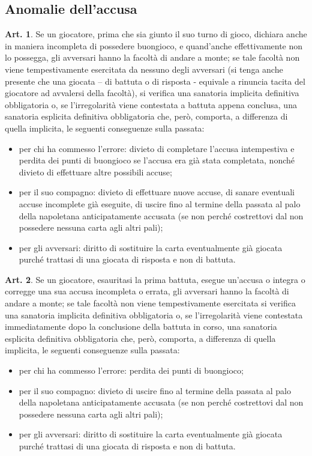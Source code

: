 \documentclass[italian,a4paper]{article}
\theoremstyle{definition}
\newtheorem{art}{Art.}
\begin{document}
\subsection{Anomalie dell'accusa}
\begin{art}
Se un giocatore, prima che sia giunto il suo turno di gioco, dichiara anche in maniera incompleta di possedere buongioco, e quand'anche effettivamente non lo possegga, gli avversari hanno la facoltà di andare a monte; se tale facoltà non viene tempestivamente esercitata da nessuno degli avversari (si tenga anche presente che una giocata – di battuta o di risposta - equivale a rinuncia tacita del giocatore ad avvalersi della facoltà), si verifica una sanatoria implicita definitiva obbligatoria o, se l'irregolarità viene contestata a battuta appena conclusa, una sanatoria esplicita definitiva obbligatoria che, però, comporta, a differenza di quella implicita, le seguenti conseguenze sulla passata:
\begin{itemize}
\item    per chi ha commesso l'errore: divieto di completare l'accusa intempestiva e perdita dei punti di buongioco se l'accusa era già stata completata, nonché divieto di effettuare altre possibili accuse;
\item    per il suo compagno: divieto di effettuare nuove accuse, di sanare eventuali accuse incomplete già eseguite, di uscire fino al termine della passata al palo della napoletana anticipatamente accusata (se non perché costrettovi dal non possedere nessuna carta agli altri pali);
\item     per gli avversari: diritto di sostituire la carta eventualmente già giocata purché trattasi di una giocata di risposta e non di battuta.
    \end{itemize}
\end{art}
\begin{art}
Se un giocatore, esauritasi la prima battuta, esegue un'accusa o integra o corregge una sua accusa incompleta o errata, gli avversari hanno la facoltà di andare a monte; se tale facoltà non viene tempestivamente esercitata si verifica una sanatoria implicita definitiva obbligatoria o, se l'irregolarità viene contestata immediatamente dopo la conclusione della battuta in corso, una sanatoria esplicita definitiva obbligatoria che, però, comporta, a differenza di quella implicita, le seguenti conseguenze sulla passata:
\begin{itemize}
\item    per chi ha commesso l'errore: perdita dei punti di buongioco;
\item    per il suo compagno: divieto di uscire fino al termine della passata al palo della napoletana anticipatamente accusata (se non perché costrettovi dal non possedere nessuna carta agli altri pali);
\item     per gli avversari: diritto di sostituire la carta eventualmente già giocata purché trattasi di una giocata di risposta e non di battuta.
    \end{itemize}
\end{art}
\end{document}
